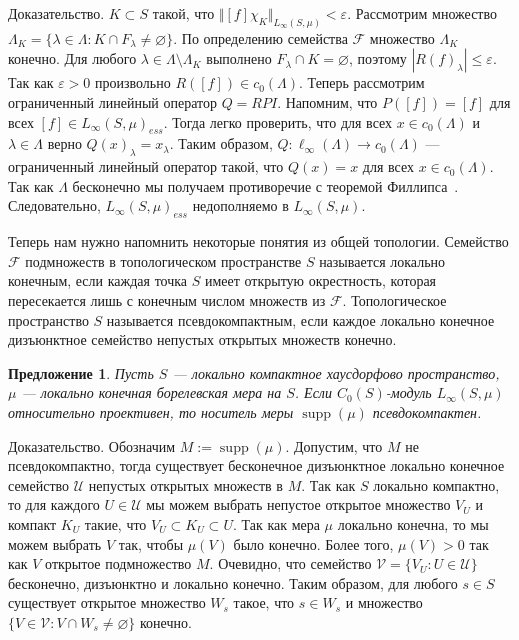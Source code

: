 \documentclass[12pt]{article}
\numberwithin{equation}{subsection}
\theoremstyle{plain}
\newtheorem{proposition}{Предложение}
\newenvironment{proof}{Доказательство.}{}
\begin{document}
\begin{fulltext}
\begin{proof}
        $K\subset S$ такой, что $\Vert
            [f]\chi_{K}\Vert_{L_\infty(S,\mu)}<\varepsilon$. Рассмотрим множество
        $\Lambda_K=\{\lambda\in\Lambda: K\cap F_\lambda\neq\varnothing \}$. По
        определению семейства $\mathcal{F}$ множество $\Lambda_K$ конечно. Для
        любого $\lambda\in\Lambda\setminus \Lambda_K$ выполнено $F_\lambda\cap
            K=\varnothing$, поэтому $|{R(f)}_\lambda|\leq\varepsilon$. Так как
        $\varepsilon>0$ произвольно $R([f])\in c_0(\Lambda)$. Теперь рассмотрим
        ограниченный линейный оператор $Q=RPI$. Напомним, что $P([f])=[f]$ для
        всех $[f]\in {L_\infty(S,\mu)}_{ess}$. Тогда легко проверить, что для
        всех $x\in c_0(\Lambda)$ и $\lambda\in\Lambda$ верно
        ${Q(x)}_\lambda=x_\lambda$. Таким образом, $Q:\ell_\infty(\Lambda)\to
        c_0(\Lambda)$ --- ограниченный линейный оператор такой, что $Q(x)=x$ для
        всех $x\in c_0(\Lambda)$. Так как $\Lambda$ бесконечно мы получаем
        противоречие с теоремой Филлипса~\cite{PhilOnLinTran}. Следовательно,
        ${L_\infty(S,\mu)}_{ess}$ недополняемо в $L_\infty(S,\mu)$.
    \end{proof}

    Теперь нам нужно напомнить некоторые понятия из общей топологии. Семейство
    $\mathcal{F}$ подмножеств в топологическом пространстве $S$ называется
    локально конечным, если каждая точка $S$ имеет открытую окрестность, которая
    пересекается лишь с конечным числом множеств из $\mathcal{F}$.
    Топологическое пространство $S$ называется псевдокомпактным, если каждое
    локально конечное дизъюнктное семейство непустых открытых множеств конечно.

    \begin{proposition}\label{LInfRelProjSuppCond} Пусть $S$ --- локально
        компактное хаусдорфово пространст\-во, $\mu$ --- локально конечная
        борелевская мера на $S$. Если $C_0(S)$-модуль $L_\infty(S,\mu)$
        относительно проективен, то носитель меры $\operatorname{supp}(\mu)$
        псевдокомпактен.
    \end{proposition}
    \begin{proof} Обозначим $M:=\operatorname{supp}(\mu)$. Допустим, что $M$ не
        псевдокомпактно, тогда существует бесконечное дизъюнктное локально
        конечное семейство $\mathcal{U}$ непустых открытых множеств в $M$. Так
        как $S$ локально компактно, то для каждого $U\in\mathcal{U}$ мы можем
        выбрать непустое открытое множество $V_U$ и компакт $K_U$ такие, что
        $V_U\subset K_U\subset  U$. Так как мера $\mu$ локально конечна, то мы
        можем выбрать $V$ так, чтобы $\mu(V)$ было конечно. Более того,
        $\mu(V)>0$ так как $V$ открытое подмножество $M$. Очевидно, что
        семейство $\mathcal{V}=\{V_U:U\in\mathcal{U}\}$ бесконечно, дизъюнктно и
        локально конечно. Таким образом, для любого $s\in S$ существует открытое
        множество $W_s$ такое, что $s\in W_s$ и множество $\{V\in\mathcal{V}:
            V\cap W_s\neq\varnothing \}$ конечно.


\end{proof}
\end{fulltext}
\end{document}
